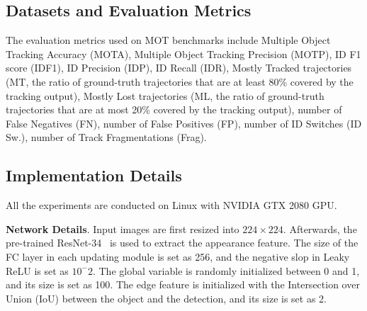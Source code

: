 \documentclass[10pt,twocolumn,letterpaper]{article}
\begin{document}
\begin{table}
\caption{Ablation Study on the MOT17 Benchmark}
\begin{center}
\end{center}
\label{tab: Ablation1}
\end{table}

\subsection{Datasets and Evaluation Metrics}
\label{sec: 51}
The evaluation metrics used on MOT benchmarks include Multiple Object Tracking Accuracy (MOTA), Multiple Object Tracking Precision (MOTP), ID F1 score (IDF1), ID Precision (IDP), ID Recall (IDR), Mostly Tracked trajectories (MT, the ratio of ground-truth trajectories that are at least 80\% covered by the tracking output), Mostly Lost trajectories (ML, the ratio of ground-truth trajectories that are at most 20\% covered by the tracking output), number of False Negatives (FN), number of False Positives (FP), number of ID Switches (ID Sw.), number of Track Fragmentations (Frag).

\subsection{Implementation Details}
All the experiments are conducted on Linux with NVIDIA GTX 2080 GPU.

\textbf{Network Details}.
Input images are first resized into $224 \times 224$.
Afterwards, the pre-trained ResNet-34~\cite{he2016deep} is used to extract the appearance feature.
The size of the FC layer in each updating module is set as 256,
and the negative slop in Leaky ReLU is set as $10^-2$.
The global variable is randomly initialized between 0 and 1, 
and its size is set as 100.
The edge feature is initialized with the Intersection over Union (IoU) between the object and the detection, 
and its size is set as 2.
\end{document}
